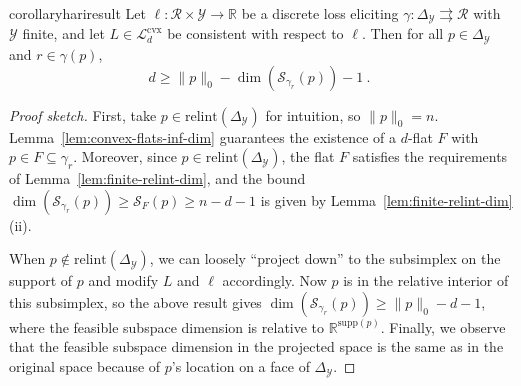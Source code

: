 \documentclass[anon,12pt]{colt2021} %
\newcommand{\Comments}{1}
\newcommand{\mynote}[2]{\ifnum\Comments=1\textcolor{#1}{#2}\fi}
\newcommand{\mytodo}[2]{\ifnum\Comments=1%
	\todo[linecolor=#1!80!black,backgroundcolor=#1,bordercolor=#1!80!black]{#2}\fi}
\newcommand{\jessiet}[1]{\mytodo{purple!20!white}{JF: #1}}
\newcommand{\bo}[1]{\mynote{blue}{[Bo: #1]}}
\newcommand{\btw}[1]{\mytodo{orange!80!white}{BTW: #1}}
\newcommand{\reals}{\mathbb{R}}
\newcommand{\simplex}{\Delta_\Y}
\newcommand{\relint}[1]{\mathrm{relint}(#1)}
\newcommand{\ccdim}{\mathrm{cc\,dim}}
\newcommand{\supp}{\mathrm{supp}}
\newcommand{\codim}{\mathrm{codim}}
\newcommand{\Lcvx}{\mathcal{L}^{\mathrm{cvx}}}
\newcommand{\R}{\mathcal{R}}
\newcommand{\Sc}{\mathcal{S}}  %
\newcommand{\Scr}{\mathcal{S}}  %
\newcommand{\Y}{\mathcal{Y}}
\newcommand{\toto}{\rightrightarrows}
\begin{document}
\begin{restatable}{corollary}{hariresult}\label{cor:fsd-bound}
	Let $\ell:\R \times \Y \to \reals$ be a discrete loss eliciting $\gamma:\simplex \toto \R$ with $\Y$ finite, and let $L \in \Lcvx_d$ be consistent with respect to $\ell$.
	Then for all $p \in \simplex$ and $r \in \gamma(p)$,
	\begin{equation}
	  d \geq \|p\|_0 - \dim(\Sc_{\gamma_r}(p)) - 1~.~
	\end{equation}
\end{restatable}
\begin{proof}[Proof sketch]
	First, take $p \in \relint{\simplex}$ for intuition, so $\|p\|_0 = n$.
	Lemma~\ref{lem:convex-flats-inf-dim} guarantees the existence of a $d$-flat $F$ with $p \in F \subseteq \gamma_r$.
	Moreover, since $p \in \relint{\simplex}$, the flat $F$ satisfies the requirements of Lemma~\ref{lem:finite-relint-dim}, and the bound $\dim(\Sc_{\gamma_r}(p)) \geq \Scr_F(p) \geq n - d- 1$ is given by Lemma~\ref{lem:finite-relint-dim} (ii).

	When $p \not \in \relint{\simplex}$, we can loosely ``project down'' to the subsimplex on the support of $p$ and modify $L$ and $\ell$ accordingly.
	Now $p$ is in the relative interior of this subsimplex, so the above result gives $\dim(\Sc_{\gamma_r}(p)) \geq \|p\|_0 - d - 1$, where the feasible subspace dimension is relative to $\reals^{\supp(p)}$.
	Finally, we observe that the feasible subspace dimension in the projected space is the same as in the original space because of $p$'s location on a face of $\simplex$.
\end{proof}
\end{document}
